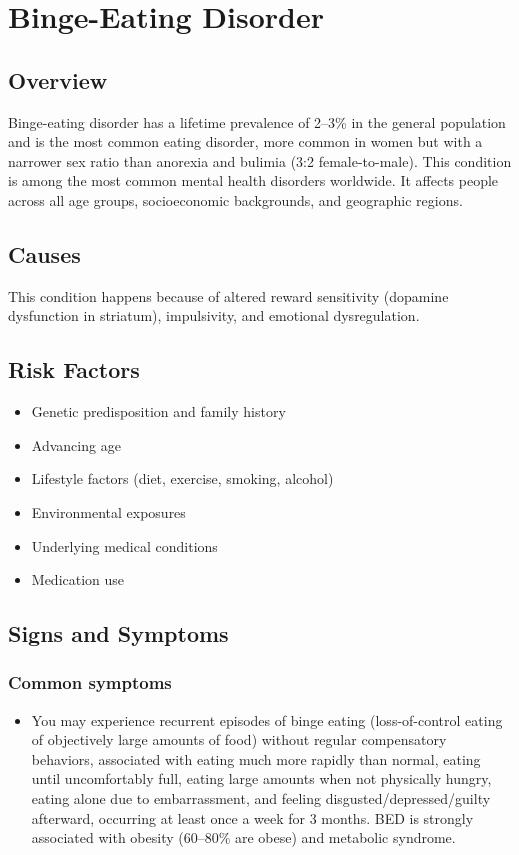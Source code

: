 \chapter{Binge-Eating Disorder}
\label{sec:Binge-Eating Disorder}

\section{Overview}
Binge-eating disorder has a lifetime prevalence of 2--3\% in the general population and is the most common eating disorder, more common in women but with a narrower sex ratio than anorexia and bulimia (3:2 female-to-male). This condition is among the most common mental health disorders worldwide. It affects people across all age groups, socioeconomic backgrounds, and geographic regions.
\section{Causes}
This condition happens because of altered reward sensitivity (dopamine dysfunction in striatum), impulsivity, and emotional dysregulation.     
\section{Risk Factors}

\begin{itemize}[noitemsep]
  \item Genetic predisposition and family history
  \item Advancing age
  \item Lifestyle factors (diet, exercise, smoking, alcohol)
  \item Environmental exposures
  \item Underlying medical conditions
  \item Medication use
\end{itemize}
\section{Signs and Symptoms}

\subsection{Common symptoms}
\begin{itemize}[noitemsep]
  \item You may experience recurrent episodes of binge eating (loss-of-control eating of objectively large amounts of food) without regular compensatory behaviors, associated with eating much more rapidly than normal, eating until uncomfortably full, eating large amounts when not physically hungry, eating alone due to embarrassment, and feeling disgusted/depressed/guilty afterward, occurring at least once a week for 3 months. BED is strongly associated with obesity (60--80\% are obese) and metabolic syndrome. 
  \end{itemize}

